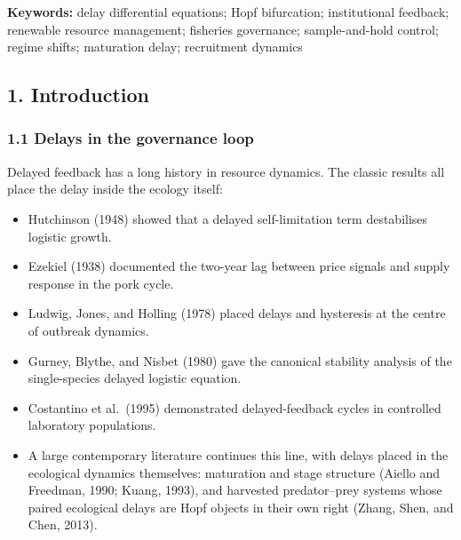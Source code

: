 \documentclass[11pt]{article}
\providecommand{\tightlist}{\setlength{\itemsep}{0pt}\setlength{\parskip}{0pt}}
\begin{document}
\textbf{Keywords:} delay differential equations; Hopf bifurcation;
institutional feedback; renewable resource management; fisheries
governance; sample-and-hold control; regime shifts; maturation delay;
recruitment dynamics

\subsection{1. Introduction}\label{introduction}

\subsubsection{1.1 Delays in the governance
loop}\label{delays-in-the-governance-loop}

Delayed feedback has a long history in resource dynamics. The classic
results all place the delay inside the ecology itself:

\begin{itemize}
\tightlist
\item
  Hutchinson (1948) showed that a delayed self-limitation term
  destabilises logistic growth.
\item
  Ezekiel (1938) documented the two-year lag between price signals and
  supply response in the pork cycle.
\item
  Ludwig, Jones, and Holling (1978) placed delays and hysteresis at the
  centre of outbreak dynamics.
\item
  Gurney, Blythe, and Nisbet (1980) gave the canonical stability
  analysis of the single-species delayed logistic equation.
\item
  Costantino et al.~(1995) demonstrated delayed-feedback cycles in
  controlled laboratory populations.
\item
  A large contemporary literature continues this line, with delays
  placed in the ecological dynamics themselves: maturation and stage
  structure (Aiello and Freedman, 1990; Kuang, 1993), and harvested
  predator--prey systems whose paired ecological delays are Hopf objects
  in their own right (Zhang, Shen, and Chen, 2013).
\end{itemize}
\end{document}
